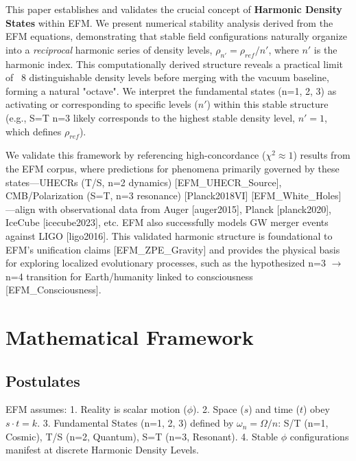\documentclass[11pt]{article}
\begin{document}
This paper establishes and validates the crucial concept of \textbf{Harmonic Density States} within EFM. We present numerical stability analysis derived from the EFM equations, demonstrating that stable field configurations naturally organize into a \textit{reciprocal} harmonic series of density levels, \(\rho_{n'} = \rho_{ref}/n'\), where \(n'\) is the harmonic index. This computationally derived structure reveals a practical limit of ~8 distinguishable density levels before merging with the vacuum baseline, forming a natural "octave". We interpret the fundamental states (n=1, 2, 3) as activating or corresponding to specific levels (\(n'\)) within this stable structure (e.g., S=T n=3 likely corresponds to the highest stable density level, \(n'=1\), which defines \(\rho_{ref}\)).

We validate this framework by referencing high-concordance (\(\chi^2 \approx 1\)) results from the EFM corpus, where predictions for phenomena primarily governed by these states—UHECRs (T/S, n=2 dynamics) [EFM\_UHECR\_Source], CMB/Polarization (S=T, n=3 resonance) [Planck2018VI] [EFM\_White\_Holes] —align with observational data from Auger [auger2015], Planck [planck2020], IceCube [icecube2023], etc. EFM also successfully models GW merger events against LIGO [ligo2016]. This validated harmonic structure is foundational to EFM's unification claims [EFM\_ZPE\_Gravity] and provides the physical basis for exploring localized evolutionary processes, such as the hypothesized n=3 \(\to\) n=4 transition for Earth/humanity linked to consciousness [EFM\_Consciousness].

\section{Mathematical Framework}
\subsection{Postulates} %
EFM assumes: 1. Reality is scalar motion (\(\phi\)). 2. Space (\(s\)) and time (\(t\)) obey \(s \cdot t = k\). 3. Fundamental States (n=1, 2, 3) defined by \(\omega_n = \Omega/n\): S/T (n=1, Cosmic), T/S (n=2, Quantum), S=T (n=3, Resonant). 4. Stable \(\phi\) configurations manifest at discrete Harmonic Density Levels.
\end{document}
